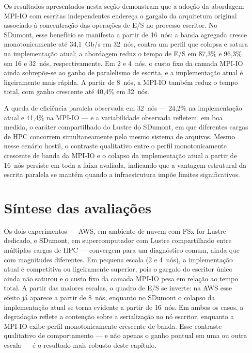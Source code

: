 Os resultados apresentados nesta seção demonstram que a adoção da
abordagem MPI-IO com escritas independentes endereça o gargalo da
arquitetura original associado à concentração das operações de E/S
no processo escritor. No SDumont, esse benefício se manifesta a
partir de 16~nós: a banda agregada cresce monotonicamente até
34{,}1~Gb/s em 32~nós, contra um perfil que colapsa e satura na
implementação atual; a abordagem reduz o tempo de E/S em 87{,}3\%
e 96{,}3\% em 16 e 32~nós, respectivamente. Em 2 e 4~nós, o
custo fixo da camada MPI-IO ainda sobrepõe-se ao ganho de
paralelismo de escrita, e a implementação atual é ligeiramente mais
rápida. A partir de 8~nós, a MPI-IO também reduz o tempo total, com
ganho crescente até 40{,}4\% em 32~nós.

A queda de eficiência paralela observada em 32~nós --- 24{,}2\% na
implementação atual e 41{,}4\% na MPI-IO --- e a variabilidade
observada refletem, em boa medida, o caráter compartilhado do
Lustre do SDumont, em que diferentes cargas de HPC concorrem
simultaneamente pelo mesmo sistema de arquivos. Mesmo nesse cenário
hostil, o contraste qualitativo entre o perfil monotonicamente
crescente de banda da MPI-IO e o colapso da implementação atual a
partir de 16~nós persiste em toda a faixa avaliada, indicando que a
vantagem estrutural da escrita paralela se mantém quando a
infraestrutura impõe limites significativos.

\section{Síntese das avaliações}
\label{sec:sintese_avaliacoes}

Os dois experimentos --- AWS, em ambiente de nuvem com FSx for Lustre
dedicado, e SDumont, em supercomputador com Lustre compartilhado
entre múltiplas cargas de HPC --- convergem para um diagnóstico
comum, ainda que com magnitudes diferentes. Em pequena escala (2 e
4~nós), a implementação atual é competitiva ou ligeiramente
superior, pois o gargalo do escritor único ainda não saturou e o
custo fixo da camada MPI-IO pesa em relação ao tempo total. A partir
das maiores escalas, o quadro de E/S se inverte: na AWS esse efeito já
aparece a partir de 8~nós, enquanto no SDumont o colapso da
implementação atual se torna evidente a partir de 16~nós. Em ambos os
casos, a degradação reflete a contenção sobre a serialização no nó
escritor, enquanto a MPI-IO exibe perfil monotonicamente crescente de
banda. Esse contraste
qualitativo de comportamento --- e não apenas o ganho pontual em uma
ou outra escala --- é o resultado mais robusto deste capítulo.

